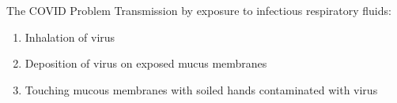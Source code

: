 \begin{slide}{The COVID Problem}
	Transmission by exposure to infectious respiratory fluids:
	\begin{enumerate}
		\item Inhalation of virus
		\item Deposition of virus on exposed mucus membranes
		\item Touching mucous membranes with soiled hands contaminated with virus
	\end{enumerate}
\end{slide}